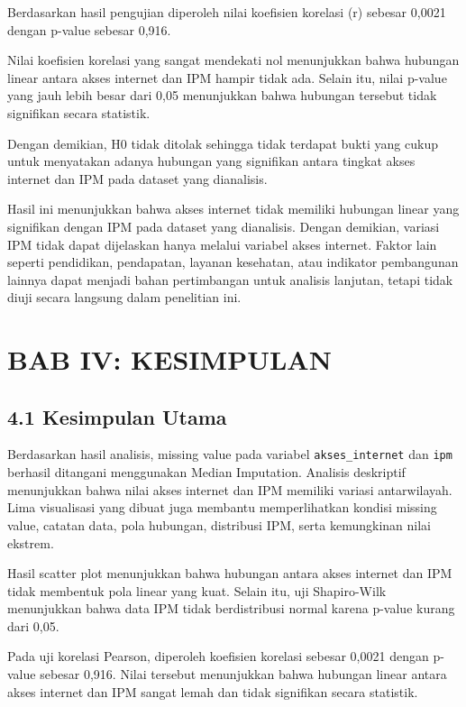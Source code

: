 \documentclass[
  indonesian,
  letterpaper,
  DIV=11,
  numbers=noendperiod]{scrartcl}
\begin{document}
Berdasarkan hasil pengujian diperoleh nilai koefisien korelasi (r)
sebesar 0,0021 dengan p-value sebesar 0,916.

Nilai koefisien korelasi yang sangat mendekati nol menunjukkan bahwa
hubungan linear antara akses internet dan IPM hampir tidak ada. Selain
itu, nilai p-value yang jauh lebih besar dari 0,05 menunjukkan bahwa
hubungan tersebut tidak signifikan secara statistik.

Dengan demikian, H0 tidak ditolak sehingga tidak terdapat bukti yang
cukup untuk menyatakan adanya hubungan yang signifikan antara tingkat
akses internet dan IPM pada dataset yang dianalisis.

Hasil ini menunjukkan bahwa akses internet tidak memiliki hubungan
linear yang signifikan dengan IPM pada dataset yang dianalisis. Dengan
demikian, variasi IPM tidak dapat dijelaskan hanya melalui variabel
akses internet. Faktor lain seperti pendidikan, pendapatan, layanan
kesehatan, atau indikator pembangunan lainnya dapat menjadi bahan
pertimbangan untuk analisis lanjutan, tetapi tidak diuji secara langsung
dalam penelitian ini.

\section{BAB IV: KESIMPULAN}\label{bab-iv-kesimpulan}

\subsection{4.1 Kesimpulan Utama}\label{kesimpulan-utama}

Berdasarkan hasil analisis, missing value pada variabel
\texttt{akses\_internet} dan \texttt{ipm} berhasil ditangani menggunakan
Median Imputation. Analisis deskriptif menunjukkan bahwa nilai akses
internet dan IPM memiliki variasi antarwilayah. Lima visualisasi yang
dibuat juga membantu memperlihatkan kondisi missing value, catatan data,
pola hubungan, distribusi IPM, serta kemungkinan nilai ekstrem.

Hasil scatter plot menunjukkan bahwa hubungan antara akses internet dan
IPM tidak membentuk pola linear yang kuat. Selain itu, uji Shapiro-Wilk
menunjukkan bahwa data IPM tidak berdistribusi normal karena p-value
kurang dari 0,05.

Pada uji korelasi Pearson, diperoleh koefisien korelasi sebesar 0,0021
dengan p-value sebesar 0,916. Nilai tersebut menunjukkan bahwa hubungan
linear antara akses internet dan IPM sangat lemah dan tidak signifikan
secara statistik.
\end{document}
